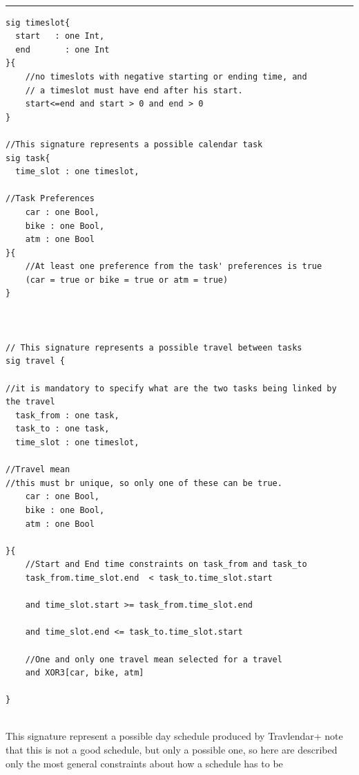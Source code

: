 \\
\rule{\textwidth}{0.4pt}

\begin{verbatim}
sig timeslot{
  start   : one Int,
  end		: one Int 
}{
    //no timeslots with negative starting or ending time, and
    // a timeslot must have end after his start.
	start<=end and start > 0 and end > 0
}

//This signature represents a possible calendar task
sig task{
  time_slot : one timeslot,

//Task Preferences
    car : one Bool,
    bike : one Bool,
    atm : one Bool
}{
    //At least one preference from the task' preferences is true
    (car = true or bike = true or atm = true)
}



// This signature represents a possible travel between tasks
sig travel {

//it is mandatory to specify what are the two tasks being linked by the travel
  task_from : one task,
  task_to : one task,
  time_slot : one timeslot,

//Travel mean 
//this must br unique, so only one of these can be true.
    car : one Bool,
    bike : one Bool,
    atm : one Bool

}{
    //Start and End time constraints on task_from and task_to
    task_from.time_slot.end  < task_to.time_slot.start   

    and time_slot.start >= task_from.time_slot.end         

    and time_slot.end <= task_to.time_slot.start

    //One and only one travel mean selected for a travel
    and XOR3[car, bike, atm]

}
\end{verbatim}
\hrulefill 
\\
This signature represent a possible day schedule produced by Travlendar+
note that this is not a good schedule, but only a possible one, so here
are described only the most general constraints about how a schedule has to
be
